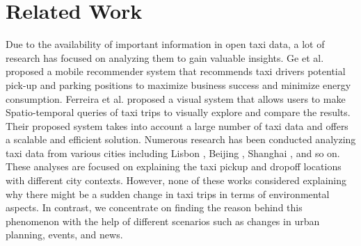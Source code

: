 \section{Related Work}
Due to the availability of important information in open taxi data, a lot of research has focused on analyzing them to gain valuable insights. Ge et al. \cite{ge2010energy} proposed a mobile recommender system that recommends taxi drivers potential pick-up and parking positions to maximize business success and minimize energy consumption. Ferreira et al. \cite{ferreira2013visual} proposed a visual system that allows users to make Spatio-temporal queries of taxi trips to visually explore and compare the results. Their proposed system takes into account a large number of taxi data and offers a scalable and efficient solution. Numerous research has been conducted analyzing taxi data from various cities including Lisbon \cite{veloso2011exploratory}, Beijing \cite{liang2012scaling}, Shanghai \cite{peng2012collective}, and so on. These analyses are focused on explaining the taxi pickup and dropoff locations with different city contexts. However, none of these works considered explaining why there might be a sudden change in taxi trips in terms of environmental aspects. In contrast, we concentrate on finding the reason behind this phenomenon with the help of different scenarios such as changes in urban planning, events, and news.  


	

